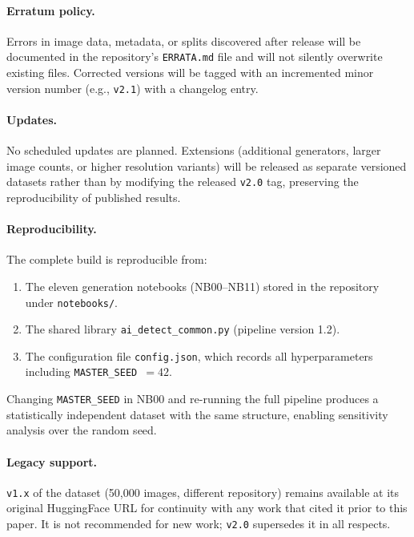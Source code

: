 \paragraph{Erratum policy.}
Errors in image data, metadata, or splits discovered after release
will be documented in the repository's \texttt{ERRATA.md} file and
will not silently overwrite existing files.
Corrected versions will be tagged with an incremented minor version
number (e.g., \texttt{v2.1}) with a changelog entry.

\paragraph{Updates.}
No scheduled updates are planned.
Extensions (additional generators, larger image counts, or
higher resolution variants) will be released as separate versioned
datasets rather than by modifying the released \texttt{v2.0} tag,
preserving the reproducibility of published results.

\paragraph{Reproducibility.}
The complete build is reproducible from:
\begin{enumerate}[leftmargin=1.5em, itemsep=2pt]
  \item The eleven generation notebooks (NB00--NB11) stored in the
    repository under \texttt{notebooks/}.
  \item The shared library \texttt{ai\_detect\_common.py}
    (pipeline version 1.2).
  \item The configuration file \texttt{config.json}, which records
    all hyperparameters including \texttt{MASTER\_SEED}~$= 42$.
\end{enumerate}
Changing \texttt{MASTER\_SEED} in NB00 and re-running the full
pipeline produces a statistically independent dataset with the same
structure, enabling sensitivity analysis over the random seed.

\paragraph{Legacy support.}
\texttt{v1.x} of the dataset (50,000 images, different repository)
remains available at its original HuggingFace URL for continuity
with any work that cited it prior to this paper.
It is not recommended for new work; \texttt{v2.0} supersedes it
in all respects.


